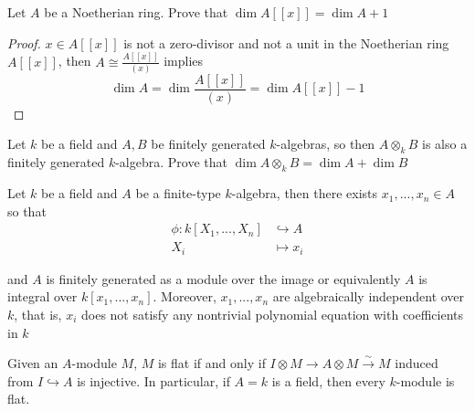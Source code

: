 \begin{problem}
	Let $A$ be a Noetherian ring. Prove that $\dim A[[x]] = \dim A + 1$
\end{problem}

\begin{proof}
	$x \in A[[x]]$ is not a zero-divisor and not a unit in the Noetherian ring $A[[x]]$, then $A \cong \frac{A[[x]]}{(x)}$ implies
	$$
		\dim A = \dim \frac{A[[x]]}{(x)} = \dim A[[x]] - 1
	$$
\end{proof}

\begin{problem}
	Let $k$ be a field and $A, B$ be finitely generated $k$-algebras, so then $A \otimes_k B$ is also a finitely generated $k$-algebra. Prove that $\dim A \otimes_k B = \dim A + \dim B$
\end{problem}

\begin{lemma}
	Let $k$ be a field and $A$ be a finite-type $k$-algebra, then there exists $x_1, ..., x_n \in A$ so that
	\begin{align*}
		\phi: k[X_1, ..., X_n] &\hookrightarrow A \\
		X_i &\mapsto x_i
	\end{align*}
	
	and $A$ is finitely generated as a module over the image or equivalently $A$ is integral over $k[x_1, ..., x_n]$. Moreover, $x_1, ..., x_n$ are algebraically independent over $k$, that is, $x_i$ does not satisfy any nontrivial polynomial equation with coefficients in $k$
\end{lemma}

\begin{lemma}
	\label{lemma13}
	Given an $A$-module $M$, $M$ is flat if and only if $I \otimes M \to A \otimes M \xrightarrow{\sim} M$ induced from $I \hookrightarrow A$ is injective. In particular, if $A = k$ is a field, then every $k$-module is flat.
\end{lemma}

